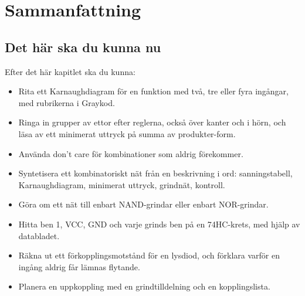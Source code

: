 
\section{Sammanfattning}
\label{c4:sec:summary}

\subsection*{Det här ska du kunna nu}
Efter det här kapitlet ska du kunna:
\begin{itemize}
  \item Rita ett Karnaughdiagram för en funktion med två, tre eller fyra ingångar, med rubrikerna i
    Graykod.
  \item Ringa in grupper av ettor efter reglerna, också över kanter och i hörn, och läsa av ett
    minimerat uttryck på summa av produkter-form.
  \item Använda don't care för kombinationer som aldrig förekommer.
  \item Syntetisera ett kombinatoriskt nät från en beskrivning i ord: sanningstabell,
    Karnaughdiagram, minimerat uttryck, grindnät, kontroll.
  \item Göra om ett nät till enbart NAND-grindar eller enbart NOR-grindar.
  \item Hitta ben 1, VCC, GND och varje grinds ben på en 74HC-krets, med hjälp av databladet.
  \item Räkna ut ett förkopplingsmotstånd för en lysdiod, och förklara varför en ingång aldrig får
    lämnas flytande.
  \item Planera en uppkoppling med en grindtilldelning och en kopplingslista.
\end{itemize}

